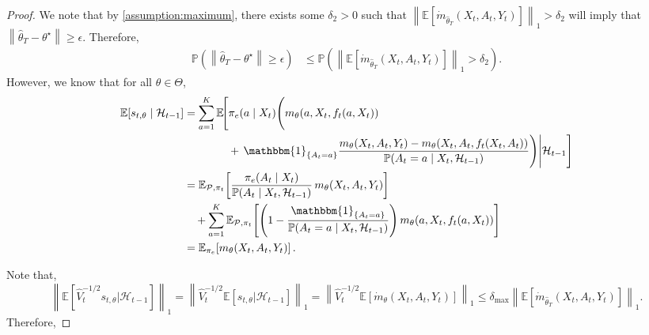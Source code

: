 \documentclass[10pt,a4paper]{amsart}
\newcommand{\E}{\mathbb{E}}
\newcommand{\norm}[1]{\left\lVert#1\right\rVert}
\begin{document}
\begin{proof}
We note that by \cref{assumption:maximum}, there exists some $\delta_{2} > 0$ such that $\norm{ \E\left[ \dot{m}_{\hat{\theta}_{T} }(X_{t},A_{t},Y_{t}) \right]}_{1} > \delta_{2}$ will imply that $\norm{\hat{\theta}_{T} - \theta^{\star}} \ge \epsilon$. Therefore, 
\begin{align*}
    \mathbb{P} \left(\norm{\hat{\theta}_{T} - \theta^{\star}} \ge \epsilon \right) &\le \mathbb{P} \left( \norm{ \E\left[ \dot{m}_{\hat{\theta}_{T} }(X_{t},A_{t},Y_{t}) \right]}_{1} > \delta_{2} \right).
\end{align*}
However, we know that for all $\theta \in \Theta$, 
\begin{align*}
\E\!\left[s_{t,\theta}\mid \mathcal{H}_{t-1}\right]
&=
\sum_{a=1}^{K}
\E\!\Bigg[
\Bigg.
\pi_{e}(a \mid X_{t})
\Bigg(
m_{\theta}(a,X_{t},f_{t}(a,X_{t}))  \\
&\qquad\qquad
+\, \mathbbm{1}_{\{A_{t}=a\}}
\frac{
m_{\theta}(X_{t},A_{t},Y_{t})
-
m_{\theta}(X_{t},A_{t},f_{t}(X_{t},A_{t}))
}{
\mathbb{P}(A_{t}=a \mid X_{t},\mathcal{H}_{t-1})
}
\Bigg)
\Bigg| \mathcal{H}_{t-1}
\Bigg] \\
&=
\E_{\mathcal{P},\pi_{t}}\!\left[
\frac{\pi_{e}(A_{t}\mid X_{t})}{\mathbb{P}(A_{t}\mid X_{t},\mathcal{H}_{t-1})}
\, m_{\theta}(X_{t},A_{t},Y_{t})
\right] \\
&\quad
+ \sum_{a =1}^{K}
\E_{\mathcal{P},\pi_{t}}\!\left[
\left(
1 -
\frac{\mathbbm{1}_{\{A_t=a\}}}{\mathbb{P}(A_{t}=a\mid X_{t}, \mathcal{H}_{t-1})}
\right)
m_{\theta}(a,X_{t},f_{t}(a,X_{t}))
\right] \\
&=
\E_{\pi_{e}}\!\left[ m_{\theta}(X_{t},A_{t},Y_{t}) \right].
\end{align*}


Note that, 
$$\norm{\mathbb{E}\left[\hat{V}_{t}^{-1/2}s_{t,\theta} | \mathcal{H}_{t-1}\right]}_{1} = \norm{\hat{V}_{t}^{-1/2} \E\left[s_{t,\theta} |\mathcal{H}_{t-1}\right]}_{1} =  \norm{ \hat{V}_{t}^{-1/2} \E\left[\dot{m}_{\theta} (X_{t},A_{t},Y_{t})\right]}_{1} \le \delta_{\text{max}}  \norm{\E\left[ \dot{m}_{\hat{\theta}_{T}}(X_{t},A_{t},Y_{t}) \right]}_{1}.$$
Therefore,


\end{proof}
\end{document}
